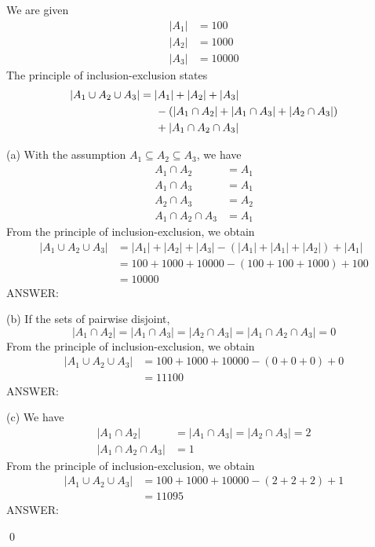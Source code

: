 We are given
\begin{align*}
|A_1| &= 100 \\
|A_2| &= 1000 \\
|A_3| &= 10000
\end{align*}
The principle of inclusion-exclusion states
\begin{align*}
|A_1 \cup A_2 \cup A_3| &= |A_1| + |A_2| + |A_3| \\ 
                       & \hspace{0.5cm} 
                         - \left( |A_1 \cap A_2| + |A_1 \cap A_3| + |A_2 \cap A_3| \right) \\
                       & \hspace{0.5cm} + |A_1 \cap A_2 \cap A_3|
\end{align*}


(a)
With the assumption $A_1 \subseteq A_2 \subseteq A_3$, we have
\begin{align*}
A_1 \cap A_2          &= A_1 \\
A_1 \cap A_3          &= A_1 \\
A_2 \cap A_3          &= A_2 \\
A_1 \cap A_2 \cap A_3 &= A_1
\end{align*}
From the principle of inclusion-exclusion, we obtain
\begin{align*}
|A_1 \cup A_2 \cup A_3|
&= |A_1| + |A_2| + |A_3| - \left( |A_1| + |A_1| + |A_2| \right) + |A_1| \\
&= 100 + 1000 + 10000 - (100 + 100 + 1000) + 100 \\
&= 10000
\end{align*}
ANSWER:


(b) If the sets of pairwise disjoint,
\[
|A_1 \cap A_2| = |A_1 \cap A_3| = |A_2 \cap A_3| = |A_1 \cap A_2 \cap A_3| = 0
\]
From the principle of inclusion-exclusion, we obtain
\begin{align*}
|A_1 \cup A_2 \cup A_3| &= 100 + 1000 + 10000 - (0 + 0 + 0) + 0 \\
                        &= 11100
\end{align*}
ANSWER:


(c) We have
\begin{align*}
|A_1 \cap A_2|          &= |A_1 \cap A_3| = |A_2 \cap A_3| = 2 \\ 
|A_1 \cap A_2 \cap A_3| &= 1
\end{align*}
From the principle of inclusion-exclusion, we obtain
\begin{align*}
|A_1 \cup A_2 \cup A_3| &= 100 + 1000 + 10000 - (2 + 2 + 2) + 1 \\
                        &= 11095
\end{align*}
ANSWER:

\qed
